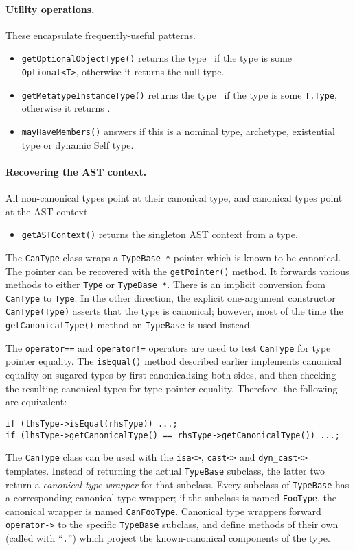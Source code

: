 \documentclass[../generics]{subfiles}
\begin{document}
\paragraph{Utility operations.} These encapsulate frequently-useful patterns.
\begin{itemize}
\item \texttt{getOptionalObjectType()} returns the type \tT\ if the type is some \texttt{Optional<T>}, otherwise it returns the null type.
\item \texttt{getMetatypeInstanceType()} returns the type \tT\ if the type is some \texttt{T.Type}, otherwise it returns \tT.
\item \texttt{mayHaveMembers()} answers if this is a nominal type, archetype, existential type or dynamic Self type.
\end{itemize}

\paragraph{Recovering the AST context.} All non-canonical types point at their canonical type, and canonical types point at the AST context.
\begin{itemize}
\item \texttt{getASTContext()} returns the singleton AST context from a type.
\end{itemize}

The \texttt{CanType} class wraps a \texttt{TypeBase *} pointer which is known to be canonical. The pointer can be recovered with the \texttt{getPointer()} method. It forwards various methods to either \texttt{Type} or \texttt{TypeBase~*}. There is an implicit conversion from \texttt{CanType} to \texttt{Type}. In the other direction, the explicit one-argument constructor \texttt{CanType(Type)} asserts that the type is canonical; however, most of the time the \texttt{getCanonicalType()} method on \texttt{TypeBase} is used instead.

The \texttt{operator==} and \texttt{operator!=} operators are used to test \texttt{CanType} for type pointer equality. The \texttt{isEqual()} method described earlier implements canonical equality on sugared types by first canonicalizing both sides, and then checking the resulting canonical types for type pointer equality. Therefore, the following are equivalent:
\begin{Verbatim}
if (lhsType->isEqual(rhsType)) ...;
if (lhsType->getCanonicalType() == rhsType->getCanonicalType()) ...;
\end{Verbatim}
The \texttt{CanType} class can be used with the \verb|isa<>|, \verb|cast<>| and \verb|dyn_cast<>| templates. Instead of returning the actual \texttt{TypeBase} subclass, the latter two return a \emph{canonical type wrapper} for that subclass. Every subclass of \texttt{TypeBase} has a corresponding canonical type wrapper; if the subclass is named \texttt{FooType}, the canonical wrapper is named \texttt{CanFooType}. Canonical type wrappers forward \texttt{operator->} to the specific \texttt{TypeBase} subclass, and define methods of their own (called with ``\texttt{.}'') which project the known-canonical components of the type.
\end{document}
